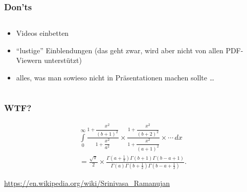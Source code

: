 \documentclass{beamer}
\begin{document}
\begin{frame}
  \frametitle{Don'ts}

  \begin{columns}
    \begin{column}{0.45\linewidth}

  \begin{itemize}
  \item<+-> Videos einbetten
  \item<+-> \enquote{lustige} Einblendungen (das geht zwar, wird aber nicht von
    allen PDF-Viewern unterstützt)
  \item<+-> alles, was man sowieso nicht in Präsentationen machen sollte \ldots
  \end{itemize}

    \end{column}
    \begin{column}{0.45\linewidth}
	\end{column}
  \end{columns}

\end{frame}

\begin{frame}[fragile]
  \frametitle{WTF?}

  \onslide<+->

  \begin{multline*}
    \int \limits _{0}^{\infty }{\frac {1+{\dfrac {x^{2}}{(b+1)^{2}}}}{1+{\dfrac
          {x^{2}}{a^{2}}}}}\times {\frac {1+{\dfrac
          {x^{2}}{(b+2)^{2}}}}{1+{\dfrac {x^{2}}{(a+1)^{2}}}}}\times \cdots \,dx \\
    = {\frac {\sqrt {\pi }}{2}}\times {\frac {\Gamma \left(a+{\frac
            {1}{2}}\right)\Gamma (b+1)\Gamma (b-a+1)}{\Gamma (a)\Gamma
        \left(b+{\frac {1}{2}}\right)\Gamma \left(b-a+{\frac {1}{2}}\right)}}.
  \end{multline*}

  \bigskip

  {\tiny \url{https://en.wikipedia.org/wiki/Srinivasa_Ramanujan}}

  \onslide<+->


\end{frame}
\end{document}
